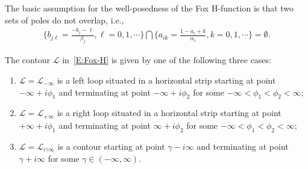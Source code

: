 \documentclass[11pt]{article}
\begin{document}
The basic assumption for the well-posedness of the Fox H-function is that two
sets of poles do not overlap, i.e.,
\begin{align}\label{E:poles}
  \bigg\{b_{j\ell}=\frac{-b_j-\ell}{\beta_j },  \ell =0, 1, \cdots\bigg\} \bigcap
  \bigg\{a_{ik}   =\frac{1-a_i + k}{\alpha_i},  k=0, 1,     \cdots\bigg\} = \emptyset.
\end{align}

The contour $\mathcal{L}$ in~\eqref{E:Fox-H} is given by one of the following
three cases:
\begin{enumerate}

  \item $\mathcal{L}=\mathcal{L}_{-\infty}$ is a left loop situated in a
    horizontal strip starting at point $-\infty+i\phi_1$ and terminating at
    point $-\infty+i\phi_2$ for some $-\infty<\phi_1< \phi_2<\infty$;

  \item $\mathcal{L}=\mathcal{L}_{+\infty}$ is a right loop situated in a
    horizontal strip starting at point $+\infty+i\phi_1$ and terminating at
    point $\infty+i\phi_2$ for some $-\infty<\phi_1< \phi_2<\infty$;

  \item $\mathcal{L}=\mathcal{L}_{i\gamma\infty}$ is a contour starting at point
    $\gamma-i\infty$ and terminating at point $\gamma+i\infty$ for some
    $\gamma\in(-\infty, \infty)$.

\end{enumerate}
\end{document}
